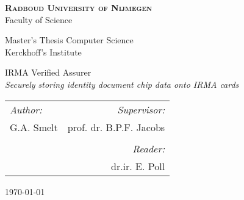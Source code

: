   \thispagestyle{empty}
  \begin{center}
    \vspace*{2cm}
    \huge{\textsc{\textbf{Radboud University of Nijmegen}}}\\
    \vspace{0.2cm}
    \LARGE{\textsf{Faculty of Science}}\par
    \vspace*{0.5cm}
    \large{\textsf{Master's Thesis Computer Science}}\\
    \LARGE{\textsf{Kerckhoff's Institute}}

    \vspace*{2cm}
    \Huge{\textsf{{IRMA Verified Assurer}}}\\
    \Large{\textsl{Securely storing identity document chip data onto IRMA cards}}

    \vspace*{4cm}
    \begin{tabularx}{0.75\textwidth}{Xr}
      \textsl{Author:} & \textsl{Supervisor:} \\
      G.A. Smelt & prof. dr. B.P.F. Jacobs\\\\
      & \textsl{Reader:}\\
      & dr.ir. E. Poll 
    \end{tabularx}

    \vspace*{2cm}
    \large{\today}
  \end{center}
\restoregeometry